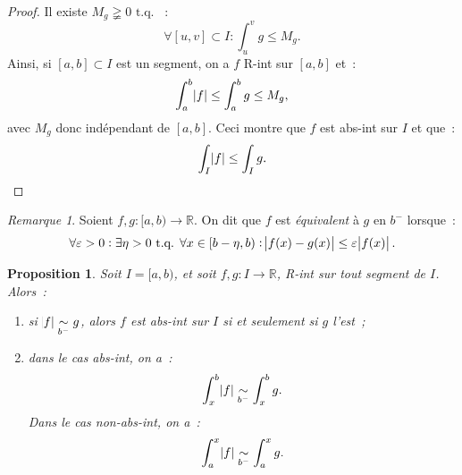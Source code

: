 \documentclass{report}
\newtheorem{prp}[thm]{Proposition}
\theoremstyle{definition}
\theoremstyle{remark}
\newtheorem*{rmq}{Remarque}
\numberwithin{equation}{section}
\newcommand{\R}{\mathbb R}
\newcommand{\tq}{\text{ t.q. }}
\begin{document}
			\begin{proof} Il existe $M_g \gneqq 0 \tq$~:
			\begin{equation}
				\forall [u, v] \subset I : \int_u^vg \leq M_g.
			\end{equation}
			Ainsi, si $[a, b] \subset I$ est un segment, on a $f$ R-int sur $[a, b]$ et~:
			\begin{equation}
				\int_a^b\abs f \leq \int_a^b g \leq M_g,
			\end{equation}
			avec $M_g$ donc indépendant de $[a, b]$. Ceci montre que $f$ est abs-int sur $I$ et que~:
			\begin{equation}
				\int_I \abs f \leq \int_I g.
			\end{equation}
			\end{proof}

			\begin{rmq} Soient $f, g : [a, b) \to \R$. On dit que $f$ est \textit{équivalent} à $g$ en $b^-$ lorsque~:
			\begin{equation}
				\forall \varepsilon > 0 : \exists \eta > 0 \tq \forall x \in [b-\eta, b) : \abs {f(x)-g(x)} \leq \varepsilon \abs {f(x)}.
			\end{equation}
			\end{rmq}

			\begin{prp} Soit $I = [a, b)$, et soit $f, g : I \to \R$, R-int sur tout segment de $I$. Alors~:
			\begin{enumerate}
				\item si $\abs f \underset {b^-}\sim g$, alors $f$ est abs-int sur $I$ si et seulement si $g$ l'est~;
				\item dans le cas abs-int, on a~:
				\begin{equation}
					\int_x^b\abs f \underset {b^-}\sim \int_x^b g.
				\end{equation}
				Dans le cas non-abs-int, on a~:
				\begin{equation}
					\int_a^x\abs f \underset {b^-}\sim \int_a^x g.
				\end{equation}
			\end{enumerate}
			\end{prp}
\end{document}
